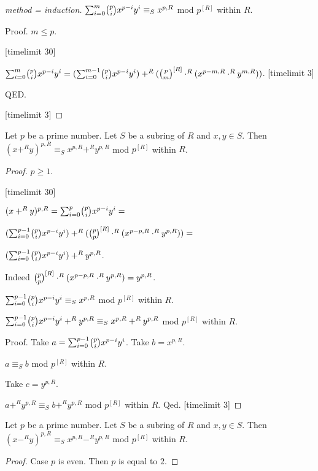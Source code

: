 \documentclass[english,11pt]{article}
\begin{document}
\begin{forthel}
\begin{proof}[method = induction]
$\binsum{m}{p}{x}{y}{R}  
\equiv_{S} x^{p,R} $ mod $p^{[R]}$ within $R$.

Proof. $m \leq p$. 

[timelimit 30]

$\binsum{m}{p}{x}{y}{R} = 
(\binsum{m-1}{p}{x}{y}{R}) +^{R} (\cho{p}{m}^{[R]} \cdot^{R} (x^{p - m,R} \cdot^{R} y^{m,R}))$.
[timelimit 3]

QED.

[timelimit 3]

\end{proof}

\begin{lemma} Let $p$ be a prime number.
Let $S$ be a subring of $R$ and $x,y \in S$. 
Then $(x +^{R} y)^{p,R} \equiv_{S} x^{p,R} +^{R} y^{p,R}$ mod $p^{[R]}$ within $R$.
\end{lemma}

\begin{proof} $p \geq 1$.

[timelimit 30]

$(x +^{R} y)^{p,R} =  \binsum{p}{p}{x}{y}{R} =$

$ (\binsum{p-1}{p}{x}{y}{R}) +^{R} (\cho{p}{p}^{[R]} \cdot^{R} (x^{p - p,R} \cdot^{R} y^{p,R})) =$

$ (\binsum{p-1}{p}{x}{y}{R}) +^{R} y^{p,R}$.

Indeed $\cho{p}{p}^{[R]} \cdot^{R} (x^{p - p,R} \cdot^{R} y^{p,R}) = y^{p,R}$.

$ \binsum{p-1}{p}{x}{y}{R} \equiv_{S} x^{p,R}$ mod $p^{[R]}$ within $R$.

$ \binsum{p-1}{p}{x}{y}{R} +^{R} y^{p,R} \equiv_{S} x^{p,R} +^{R} y^{p,R}$ mod $p^{[R]}$ within $R$.

Proof.
Take $a = \binsum{p-1}{p}{x}{y}{R}$.
Take $b = x^{p,R}$. 

$a \equiv_{S} b $ mod $p^{[R]}$ within $R$.

Take $c = y^{p,R}$.

$a +^{R} y^{p,R} \equiv_{S} b +^{R} y^{p,R} $ mod $p^{[R]}$ within $R$.
Qed.
[timelimit 3]
\end{proof}

\begin{lemma} Let $p$ be a prime number.
Let $S$ be a subring of $R$ and $x,y \in S$. 
Then $(x -^{R} y)^{p,R} \equiv_{S} x^{p,R} -^{R} y^{p,R}$ mod $p^{[R]}$ within $R$.
\end{lemma}
\begin{proof}

Case $p$ is even. Then $p$ is equal to $2$.


\end{proof}
\end{forthel}
\end{document}
